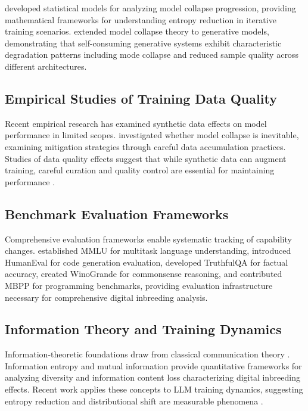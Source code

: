 \documentclass{article}
\begin{document}
\citet{seddik2024bad} developed statistical models for analyzing model collapse progression, providing mathematical frameworks for understanding entropy reduction in iterative training scenarios. \citet{alemohammad2023self} extended model collapse theory to generative models, demonstrating that self-consuming generative systems exhibit characteristic degradation patterns including mode collapse and reduced sample quality across different architectures.

\subsection{Empirical Studies of Training Data Quality}

Recent empirical research has examined synthetic data effects on model performance in limited scopes. \citet{gerstgrasser2024model} investigated whether model collapse is inevitable, examining mitigation strategies through careful data accumulation practices. Studies of data quality effects suggest that while synthetic data can augment training, careful curation and quality control are essential for maintaining performance \citep{borji2022pros}.

\subsection{Benchmark Evaluation Frameworks}

Comprehensive evaluation frameworks enable systematic tracking of capability changes. \citet{hendrycks2020measuring} established MMLU for multitask language understanding, \citet{chen2021evaluating} introduced HumanEval for code generation evaluation, \citet{lin2022truthfulqa} developed TruthfulQA for factual accuracy, \citet{sakaguchi2020winogrande} created WinoGrande for commonsense reasoning, and \citet{austin2021program} contributed MBPP for programming benchmarks, providing evaluation infrastructure necessary for comprehensive digital inbreeding analysis.

\subsection{Information Theory and Training Dynamics}

Information-theoretic foundations draw from classical communication theory \citep{shannon1948mathematical, cover1999elements}. Information entropy and mutual information provide quantitative frameworks for analyzing diversity and information content loss characterizing digital inbreeding effects. Recent work applies these concepts to LLM training dynamics, suggesting entropy reduction and distributional shift are measurable phenomena \citep{hoffmann2022training}.
\end{document}
